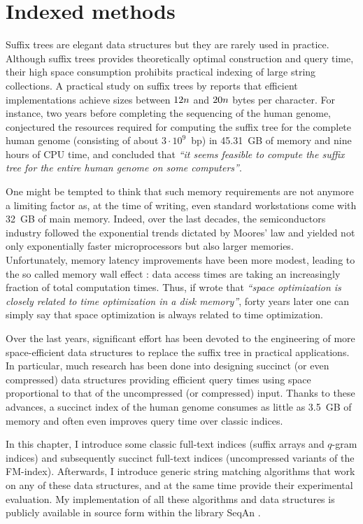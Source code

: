\chapter{Indexed methods}
\label{chr:index}

Suffix trees are elegant data structures but they are rarely used in practice.
Although suffix trees provides theoretically optimal construction and query time, their high space consumption prohibits practical indexing of large string collections.
A practical study on suffix trees by \cite{Kurtz1999} reports that efficient implementations achieve sizes between $12n$ and $20n$ bytes per character.
For instance, two years before completing the sequencing of the human genome, \citeauthor{Kurtz1999} conjectured the resources required for computing the suffix tree for the complete human genome (consisting of about $3 \cdot 10^9$~bp) in 45.31~GB of memory and nine hours of CPU time, and concluded that \emph{``it seems feasible to compute the suffix tree for the entire human genome on some computers''}.

One might be tempted to think that such memory requirements are not anymore a limiting factor as, at the time of writing, even standard workstations come with 32~GB of main memory.
Indeed, over the last decades, the semiconductors industry followed the exponential trends dictated by Moores' law and yielded not only exponentially faster microprocessors but also larger memories.
Unfortunately, memory latency improvements have been more modest, leading to the so called memory wall effect \citep{Wilkes1995}: data access times are taking an increasingly fraction of total computation times.
Thus, if \cite{Knuth1973} wrote that \emph{``space optimization is closely related to time optimization in a disk memory''}, forty years later one can simply say that space optimization is always related to time optimization.

Over the last years, significant effort has been devoted to the engineering of more space-efficient data structures to replace the suffix tree in practical applications.
In particular, much research has been done into designing succinct (or even compressed) data structures providing efficient query times using space proportional to that of the uncompressed (or compressed) input.
Thanks to these advances, a succinct index of the human genome consumes as little as 3.5~GB of memory and often even improves query time over classic indices.

In this chapter, I introduce some classic full-text indices (suffix arrays and $q$-gram indices) and subsequently succinct full-text indices (uncompressed variants of the FM-index).
Afterwards, I introduce generic string matching algorithms that work on any of these data structures, and at the same time provide their experimental evaluation.
My implementation of all these algorithms and data structures is publicly available in source form within the \CC library SeqAn \citep{Doering2008}.

